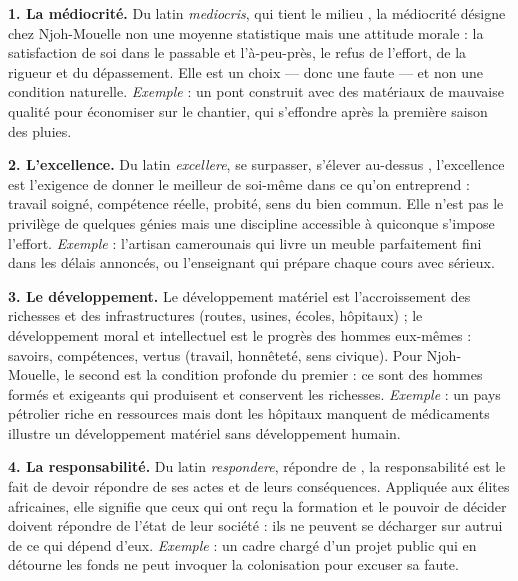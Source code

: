 \documentclass[11pt]{article}
\begin{document}
\begin{corrige}

\textbf{1. La médiocrité.} Du latin \emph{mediocris}, \guillemotleft qui tient le milieu \guillemotright, la médiocrité désigne chez Njoh-Mouelle non une moyenne statistique mais une attitude morale : la satisfaction de soi dans le \guillemotleft passable \guillemotright et l'à-peu-près, le refus de l'effort, de la rigueur et du dépassement. Elle est un choix — donc une faute — et non une condition naturelle. \emph{Exemple} : un pont construit avec des matériaux de mauvaise qualité pour économiser sur le chantier, qui s'effondre après la première saison des pluies.

\textbf{2. L'excellence.} Du latin \emph{excellere}, \guillemotleft se surpasser, s'élever au-dessus \guillemotright, l'excellence est l'exigence de donner le meilleur de soi-même dans ce qu'on entreprend : travail soigné, compétence réelle, probité, sens du bien commun. Elle n'est pas le privilège de quelques génies mais une discipline accessible à quiconque s'impose l'effort. \emph{Exemple} : l'artisan camerounais qui livre un meuble parfaitement fini dans les délais annoncés, ou l'enseignant qui prépare chaque cours avec sérieux.

\textbf{3. Le développement.} Le développement matériel est l'accroissement des richesses et des infrastructures (routes, usines, écoles, hôpitaux) ; le développement moral et intellectuel est le progrès des hommes eux-mêmes : savoirs, compétences, vertus (travail, honnêteté, sens civique). Pour Njoh-Mouelle, le second est la condition profonde du premier : ce sont des hommes formés et exigeants qui produisent et conservent les richesses. \emph{Exemple} : un pays pétrolier riche en ressources mais dont les hôpitaux manquent de médicaments illustre un développement matériel sans développement humain.

\textbf{4. La responsabilité.} Du latin \emph{respondere}, \guillemotleft répondre de \guillemotright, la responsabilité est le fait de devoir répondre de ses actes et de leurs conséquences. Appliquée aux élites africaines, elle signifie que ceux qui ont reçu la formation et le pouvoir de décider doivent répondre de l'état de leur société : ils ne peuvent se décharger sur autrui de ce qui dépend d'eux. \emph{Exemple} : un cadre chargé d'un projet public qui en détourne les fonds ne peut invoquer la colonisation pour excuser sa faute.
\end{corrige}
\end{document}
